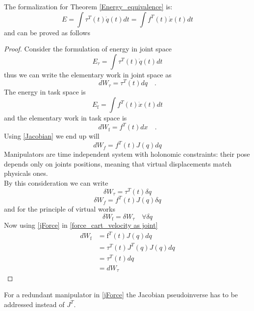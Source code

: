 The formalization for Theorem \ref{Energy_equivalence} is:
\begin{equation}
E = \int \tau^{T}(t)\dot{q}(t)dt = \int f^{T}(t)\dot{x}(t)dt
\end{equation}
and can be proved as follows
\begin{proof}
Consider the formulation of energy in joint space
\begin{equation}
	E_{\tau} = \int \tau^{T}(t)\dot{q}(t)dt
\end{equation}
thus we can write the elementary work in joint space as
\begin{equation}
	dW_{\tau} = \tau^{T}(t) dq \quad \text{.}
\end{equation}
The energy in task space is
\begin{equation}
E_{\mathrm{f}} = \int f^{T}(t)\dot{x}(t)dt
\end{equation}
and the elementary work in task space is
\begin{equation}
	dW_{\mathrm{f}} = f^{T}(t)dx \quad \text{.}
\end{equation}
Using \eqref{Jacobian} we end up will
\begin{equation}\label{force_cart_velocity as joint}
	dW_{f} = f^{T}(t)J(q)dq
\end{equation}
Manipulators are time independent system with holonomic constraints: their pose depends only on joints positions, meaning that virtual displacements match physicals ones.\\
By this consideration we can write
\begin{equation}
	\delta W_{\tau} = \tau^{T}(t) \delta q
\end{equation}
\begin{equation}
	\delta W_{ f}=f^{T}(t)J(q) \delta q
\end{equation}
and for the principle of virtual works
\begin{equation}
	\delta W_{\mathrm{f}} =\delta W_{\tau} \quad \forall \delta q
\end{equation}
Now using \eqref{jForce} in \eqref{force_cart_velocity as joint}
\begin{equation}
	\begin{split}
	dW_{ \mathrm{f}} &= \mathrm{f}^{T}(t)J(q)dq\\
	&=\tau^{T}(t)J^{T}(q)J(q)dq\\
	&=\tau^{T}(t)dq\\
	&= dW_{\tau} 			
 	\end{split}
\end{equation}
\end{proof}
For a redundant manipulator in \eqref{jForce} the Jacobian pseudoinverse has to be addressed instead of $J^{T}$.
